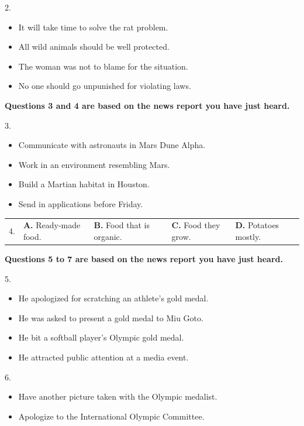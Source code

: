 \documentclass[UTF8,11pt]{ctexart}
\begin{document}
2.


\begin{itemize}[leftmargin=2em,itemsep=.2em,topsep=.4em]\item[A.] It will take time to solve the rat problem.
\item[B.] All wild animals should be well protected.
\item[C.] The woman was not to blame for the situation.
\item[D.] No one should go unpunished for violating laws.
\end{itemize}

\textbf{Questions 3 and 4 are based on the news report you have just heard.}


3.


\begin{itemize}[leftmargin=2em,itemsep=.2em,topsep=.4em]\item[A.] Communicate with astronauts in Mars Dune Alpha.
\item[B.] Work in an environment resembling Mars.
\item[C.] Build a Martian habitat in Houston.
\item[D.] Send in applications before Friday.
\end{itemize}

\noindent\begin{tabularx}{\linewidth}{@{}lXXXX@{}}4. & \textbf{A.} Ready-made food. & \textbf{B.} Food that is organic. & \textbf{C.} Food they grow. & \textbf{D.} Potatoes mostly.\\\end{tabularx}\par

\textbf{Questions 5 to 7 are based on the news report you have just heard.}


5.


\begin{itemize}[leftmargin=2em,itemsep=.2em,topsep=.4em]\item[A.] He apologized for scratching an athlete’s gold medal.
\item[B.] He was asked to present a gold medal to Miu Goto.
\item[C.] He bit a softball player’s Olympic gold medal.
\item[D.] He attracted public attention at a media event.
\end{itemize}

6.


\begin{itemize}[leftmargin=2em,itemsep=.2em,topsep=.4em]\item[A.] Have another picture taken with the Olympic medalist.
\item[B.] Apologize to the International Olympic Committee.
\end{itemize}
\end{document}

